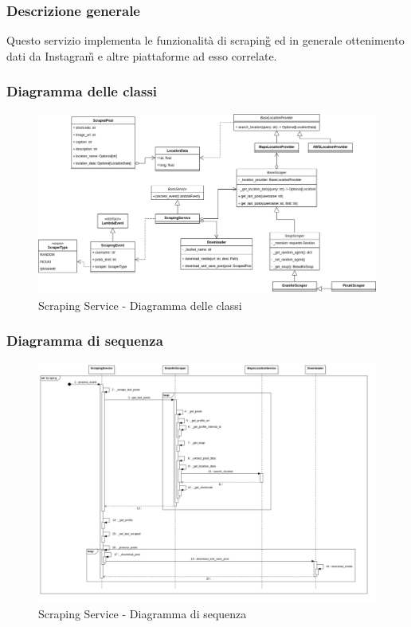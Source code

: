 \subsubsection{Descrizione generale}
Questo servizio implementa le funzionalità di scraping\G{} ed in generale ottenimento dati da Instagram\G{} e altre piattaforme ad esso correlate.

\subsubsection{Diagramma delle classi}
\begin{figure}[H]
    \includegraphics[width=15cm]{sezioni/images/cd_scraping.png}
    \centering
    \caption{Scraping Service - Diagramma delle classi}
\end{figure}

\subsubsection{Diagramma di sequenza}
\begin{figure}[H]
    \includegraphics[width=15cm]{sezioni/images/sd_scraping.png}
    \centering
    \caption{Scraping Service - Diagramma di sequenza}
\end{figure}

